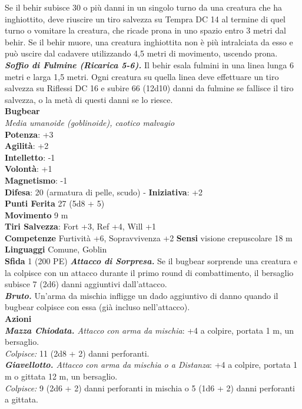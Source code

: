 \begin{multicols}{2}
Se il behir subisce 30 o più danni in un singolo turno da una creatura che ha inghiottito, deve riuscire un tiro salvezza su Tempra DC 14 al termine di quel turno o vomitare la creatura, che ricade prona in uno spazio entro 3 metri dal behir. Se il behir muore, una creatura inghiottita non è più intralciata da esso e può uscire dal cadavere utilizzando 4,5 metri di movimento, uscendo prona.\\
\emph{\textbf{Soffio di Fulmine (Ricarica 5-6).}} Il behir esala fulmini in una linea lunga 6 metri e larga 1,5 metri. Ogni creatura su quella linea deve effettuare un tiro salvezza su Riflessi DC 16 e subire 66 (12d10) danni da fulmine se fallisce il tiro salvezza, o la metà di questi danni se lo riesce.\\

\medskip\textbf{Bugbear}\\
\emph{Media umanoide (goblinoide), caotico malvagio}\\
\textbf{Potenza}: +3\\
\textbf{Agilità}: +2\\
\textbf{Intelletto}: -1\\
\textbf{Volontà}: +1\\
\textbf{Magnetismo}: -1\\
\textbf{Difesa}: 20 (armatura di pelle, scudo) - \textbf{Iniziativa}: +2\\
\textbf{Punti Ferita} 27 (5d8 + 5)\\
\textbf{Movimento} 9 m\\
\textbf{Tiri Salvezza}: Fort +3, Ref +4, Will +1\\
\textbf{Competenze} Furtività +6, Sopravvivenza +2
\textbf{Sensi} visione crepuscolare 18 m \\
\textbf{Linguaggi} Comune, Goblin\\
\textbf{Sfida} 1 (200 PE)\smallskip
\emph{\textbf{Attacco di Sorpresa.}} Se il bugbear sorprende una creatura e la colpisce con un attacco durante il primo round di combattimento, il bersaglio subisce 7 (2d6) danni aggiuntivi dall'attacco.\\
\emph{\textbf{Bruto.}} Un'arma da mischia infligge un dado aggiuntivo di danno quando il bugbear colpisce con essa (già incluso nell'attacco).\\
\smallskip\textbf{Azioni}\\
\emph{\textbf{Mazza Chiodata.} Attacco con arma da mischia}: +4 a colpire, portata 1 m, un bersaglio.\\
\emph{Colpisce:} 11 (2d8 + 2) danni perforanti.\\
\emph{\textbf{Giavellotto.} Attacco con arma da mischia o a Distanza}: +4 a colpire, portata 1 m o gittata 12 m, un bersaglio.\\
\emph{Colpisce:} 9 (2d6 + 2) danni perforanti in mischia o 5 (1d6 + 2) danni perforanti a gittata.\\


\end{multicols}
